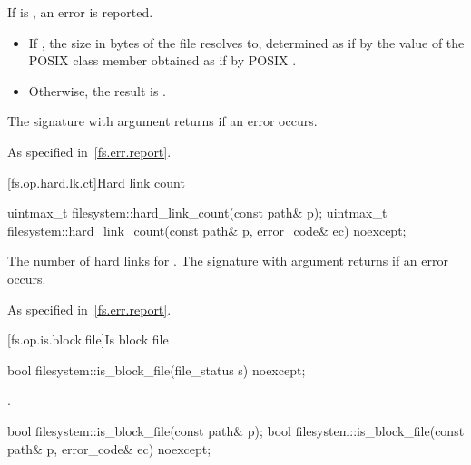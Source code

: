 \begin{itemdescr}
\pnum
\effects
If  is , an error is reported.

\pnum
\returns
\begin{itemize}
\item
  If , the size in bytes of the file
   resolves to, determined as if by the value of the POSIX 
  class member  obtained as if by POSIX .
\item
  Otherwise, the result is .
\end{itemize}
The signature with argument  returns 
if an error occurs.

\pnum
\throws
As specified in~\ref{fs.err.report}.
\end{itemdescr}


[fs.op.hard.lk.ct]{Hard link count}

%
\begin{itemdecl}
uintmax_t filesystem::hard_link_count(const path& p);
uintmax_t filesystem::hard_link_count(const path& p, error_code& ec) noexcept;
\end{itemdecl}

\begin{itemdescr}
\pnum
\returns
The number of hard links for . The signature
  with argument  returns 
  if an error occurs.

\pnum
\throws
As specified in~\ref{fs.err.report}.
\end{itemdescr}


[fs.op.is.block.file]{Is block file}

%
\begin{itemdecl}
bool filesystem::is_block_file(file_status s) noexcept;
\end{itemdecl}

\begin{itemdescr}
\pnum
\returns
{}.
\end{itemdescr}

%
\begin{itemdecl}
bool filesystem::is_block_file(const path& p);
bool filesystem::is_block_file(const path& p, error_code& ec) noexcept;
\end{itemdecl}

